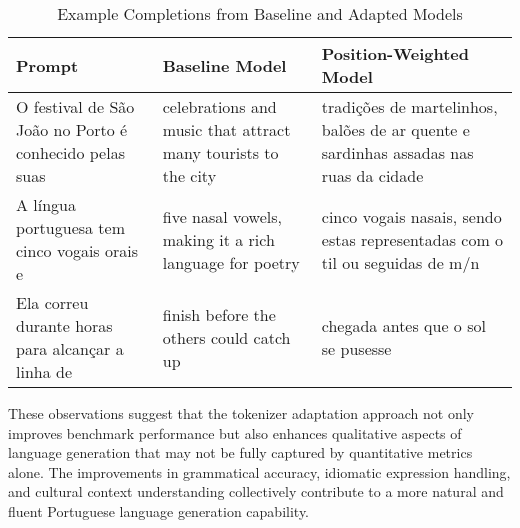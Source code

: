\begin{table}[h]
\centering
\caption{Example Completions from Baseline and Adapted Models}
\label{tab:example_completions}
\begin{tabular}{p{4cm}p{5cm}p{5cm}}
\hline
\textbf{Prompt} & \textbf{Baseline Model} & \textbf{Position-Weighted Model} \\
\hline
O festival de São João no Porto é conhecido pelas suas & celebrations and music that attract many tourists to the city & tradições de martelinhos, balões de ar quente e sardinhas assadas nas ruas da cidade \\
\hline
A língua portuguesa tem cinco vogais orais e & five nasal vowels, making it a rich language for poetry & cinco vogais nasais, sendo estas representadas com o til ou seguidas de m/n \\
\hline
Ela correu durante horas para alcançar a linha de & finish before the others could catch up & chegada antes que o sol se pusesse \\
\hline
\end{tabular}
\end{table}

These observations suggest that the tokenizer adaptation approach not only improves benchmark performance but also enhances qualitative aspects of language generation that may not be fully captured by quantitative metrics alone. The improvements in grammatical accuracy, idiomatic expression handling, and cultural context understanding collectively contribute to a more natural and fluent Portuguese language generation capability.
